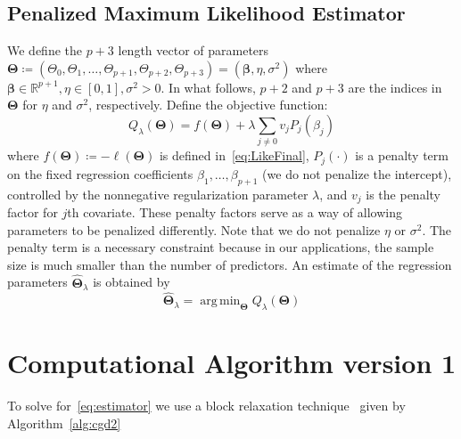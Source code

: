 \documentclass[12pt,letter]{article}\usepackage[]{graphicx}\usepackage[]{color}
\newcommand{\bTheta}{\boldsymbol{\Theta}}
\newcommand{\bbeta}{\boldsymbol{\beta}}
\DeclareMathOperator*{\argmin}{arg\,min}
\begin{document}



\subsection{Penalized Maximum Likelihood Estimator}
We define the $p+3$  length vector of parameters $\bTheta \coloneqq \left(\Theta_0, \Theta_1, \ldots, \Theta_{p+1}, \Theta_{p+2}, \Theta_{p+3}\right) =  \left(\bbeta, \eta, \sigma^2 \right)$ where $\bbeta \in \mathbb{R}^{p+1}, \eta \in [0,1], \sigma^2 >0$. In what follows, $p+2$ and $p+3$ are the indices in $\bTheta$ for $\eta$ and $\sigma^2$, respectively. Define the objective function:
\begin{equation}
	Q_{\lambda}(\bTheta) = f(\bTheta) + \lambda \sum_{j\neq 0} v_j P_j(\beta_j)
\end{equation}
where $f(\bTheta)\coloneqq-\ell(\bTheta)$ is defined in~\eqref{eq:LikeFinal}, $P_j(\cdot)$ is a penalty term on the fixed regression coefficients $\beta_1, \ldots, \beta_{p+1}$ (we do not penalize the intercept), controlled by the nonnegative regularization parameter $\lambda$, and $v_j$ is the penalty factor for $j$th covariate. These penalty factors serve as a way of allowing parameters to be penalized differently. Note that we do not penalize $\eta$ or $\sigma^2$. The penalty term is a necessary constraint because in our applications, the sample size is much smaller than the number of predictors. An estimate of the regression parameters $\widehat{\bTheta}_{\lambda}$ is obtained by
\begin{equation}
	\widehat{\bTheta}_{\lambda} = \argmin_{\bTheta} Q_{\lambda}(\bTheta) \label{eq:estimator}
\end{equation}







\section{Computational Algorithm version 1}
To solve for~\eqref{eq:estimator} we use a block relaxation technique~\citep{de1994block} given by Algorithm~\ref{alg:cgd2}
\end{document}
